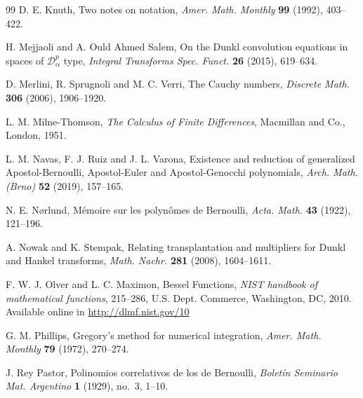 \documentclass[11pt]{article}
\theoremstyle{plain}
\theoremstyle{remark}
\numberwithin{equation}{section} %
\begin{document}
\begin{thebibliography}{99}
D. E. Knuth, 
Two notes on notation, 
\textit{Amer. Math. Monthly} 
\textbf{99} (1992), 403--422. %

H. Mejjaoli and A. Ould Ahmed Salem, 
On the Dunkl convolution equations in spaces of $\mathcal{D}_\alpha^p$ type, 
\textit{Integral Transforms Spec. Funct.}
\textbf{26} (2015), 619--634.

D. Merlini, R. Sprugnoli and M. C. Verri,
The Cauchy numbers,
\textit{Discrete Math.}
\textbf{306} (2006), 1906--1920.

L. M. Milne-Thomson, 
\textit{The Calculus of Finite Differences}, 
Macmillan and Co., London, 1951.

L. M. Navas, F. J. Ruiz and J. L. Varona, 
Existence and reduction of generalized Apostol-Bernoulli, Apostol-Euler and Apostol-Genocchi polynomials, 
\textit{Arch. Math. (Brno)} 
\textbf{52} (2019), 157--165. 

N. E. N{\o}rlund, 
M\'emoire sur les polyn\^omes de Bernoulli, 
\textit{Acta. Math.} 
\textbf{43} (1922), 121--196.


A. Nowak and K. Stempak, 
Relating transplantation and multipliers for Dunkl and Hankel transforms, 
\textit{Math. Nachr.} 
\textbf{281} (2008), 1604--1611. 

F. W. J. Olver and L. C. Maximon,
Bessel Functions,
\textit{NIST handbook of mathematical functions},
215--286, %
U.S. Dept. Commerce, Washington, DC, 2010.
Available online in \url{http://dlmf.nist.gov/10}

G. M. Phillips, 
Gregory's method for numerical integration, 
\textit{Amer. Math. Monthly}
\textbf{79} (1972), 270--274.

{J. Rey Pastor},
Polinomios correlativos de los de Bernoulli,
\textit{Bolet\'in Seminario Mat. Argentino}
\textbf{1} (1929), no.~3, 1--10.


\end{thebibliography}
\end{document}
